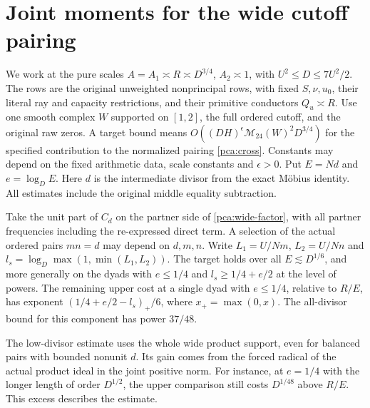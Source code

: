 \section{Joint moments for the wide cutoff pairing}
\label{pca:joint-core}

We work at the pure scales \(A=A_1\asymp R\asymp D^{3/4}\),
\(A_2\asymp1\), with \(U^2\le D\le 7U^2/2\). The rows are
the original unweighted nonprincipal rows, with fixed \(S,\nu,u_0\),
their literal ray and capacity restrictions, and their primitive
conductors \(Q_u\asymp R\). Use one smooth complex \(W\) supported
on \([1,2]\), the full ordered cutoff, and the original raw zeros.
A target bound means
\(O((DH)^\epsilon\mathcal M_{24}(W)^2 D^{3/4})\) for the
specified contribution to the normalized pairing \eqref{pca:cross}.
Constants may depend on the fixed arithmetic data, scale constants
and \(\epsilon>0\). Put \(E=Nd\) and \(e=\log_D E\).
Here \(d\) is the intermediate divisor from the exact Möbius
identity. All estimates include the original middle equality subtraction.

\begin{theorem}\label{pca:joint-full}
Take the unit part of \(C_d\) on the partner side of
\eqref{pca:wide-factor}, with all partner frequencies including the
re-expressed direct term. A selection of the actual ordered pairs
\(mn=d\) may depend on \(d,m,n\). Write \(L_1=U/Nm\),
\(L_2=U/Nn\) and \(l_s=\log_D\max(1,\min(L_1,L_2))\).
The target holds over all \(E\lesssim D^{1/6}\), and more generally
on the dyads with \(e\le1/4\) and \(l_s\ge1/4+e/2\) at
the level of powers. The remaining upper cost at a single
dyad with \(e\le1/4\), relative to \(R/E\), has exponent
\((1/4+e/2-l_s)_+/6\), where \(x_+=\max(0,x)\).
The all-divisor bound for this component has power \(37/48\).
\end{theorem}

The low-divisor estimate uses the whole wide product support, even
for balanced pairs with bounded nonunit \(d\). Its gain comes from
the forced radical of the actual product ideal in the joint positive
norm. For instance, at \(e=1/4\) with the longer length of order
\(D^{1/2}\), the upper comparison still costs \(D^{1/48}\)
above \(R/E\). This excess describes the estimate.

